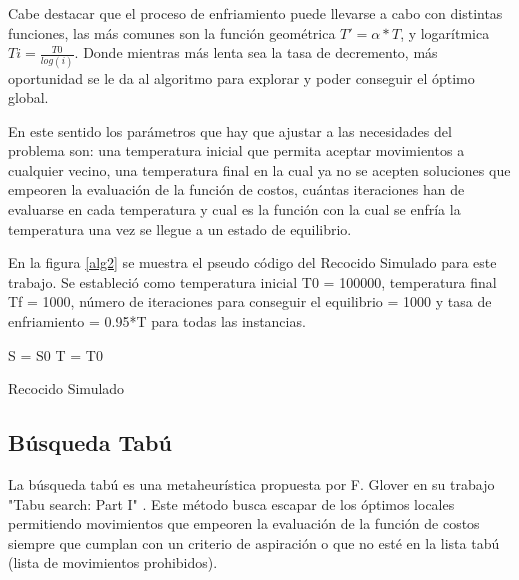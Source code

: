 \documentclass{ci5652}
\begin{document}
Cabe destacar que el proceso de enfriamiento puede llevarse a cabo con distintas funciones, las más comunes son la función geométrica $ T' = \alpha*T$, y logarítmica $Ti = \frac{T0}{log(i)}$. Donde mientras más lenta sea la tasa de decremento, más oportunidad se le da al algoritmo para explorar y poder conseguir el óptimo global.

En este sentido los parámetros que hay que ajustar a las necesidades del problema son: una temperatura inicial que permita aceptar movimientos a cualquier vecino, una temperatura final en la cual ya no se acepten soluciones que empeoren la evaluación de la función de costos, cuántas iteraciones han de evaluarse en cada temperatura y cual es la función con la cual se enfría la temperatura una vez se llegue a un estado de equilibrio.

En la figura \ref{alg2} se muestra el pseudo código del Recocido Simulado para este trabajo. Se estableció como temperatura inicial T0 = 100000, temperatura final Tf = 1000, número de iteraciones para conseguir el equilibrio = 1000 y tasa de enfriamiento = 0.95*T para todas las instancias.

\begin{algorithm}
 \label{alg2}
 \DontPrintSemicolon
 \vspace*{0.1cm}
 S = S0 
 T = T0 
 \vspace*{0.1cm}
 \caption{Recocido Simulado}
\end{algorithm}

\subsection{Búsqueda Tabú}

La búsqueda tabú es una metaheurística propuesta por F. Glover en su trabajo "Tabu search: Part I" \cite{8}. Este método busca escapar de los óptimos locales permitiendo movimientos que empeoren la evaluación de la función de costos siempre que cumplan con un criterio de aspiración o que no esté en la lista tabú (lista de movimientos prohibidos). 
\end{document}
